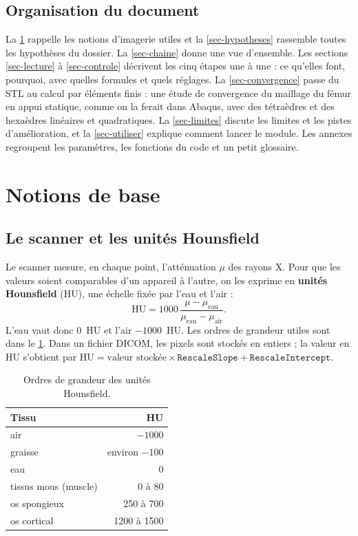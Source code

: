 \documentclass[11pt,a4paper]{article}
\begin{document}
\subsection{Organisation du document}

La \cref{sec-notions} rappelle les notions d'imagerie utiles et la \cref{sec-hypotheses} rassemble toutes les
hypothèses du dossier. La \cref{sec-chaine} donne une vue d'ensemble. Les
sections \ref{sec-lecture} à \ref{sec-controle} décrivent les cinq étapes une à une : ce qu'elles font, pourquoi, avec
quelles formules et quels réglages. La \cref{sec-convergence} passe du STL au calcul par éléments finis : une étude
de convergence du maillage du fémur en appui statique, comme on la ferait dans Abaqus, avec des tétraèdres et des
hexaèdres linéaires et quadratiques. La \cref{sec-limites} discute les limites et les pistes d'amélioration, et la
\cref{sec-utiliser} explique comment lancer le module. Les annexes regroupent les paramètres, les fonctions du code et
un petit glossaire.

\section{Notions de base}
\label{sec-notions}

\subsection{Le scanner et les unités Hounsfield}

Le scanner mesure, en chaque point, l'atténuation $\mu$ des rayons X. Pour que les valeurs soient comparables d'un
appareil à l'autre, on les exprime en \textbf{unités Hounsfield} (HU), une échelle fixée par l'eau et l'air :
\begin{equation}
  \mathrm{HU} = 1000\,\frac{\mu - \mu_{\text{eau}}}{\mu_{\text{eau}} - \mu_{\text{air}}}.
\end{equation}
L'eau vaut donc 0~HU et l'air $-1000$~HU. Les ordres de grandeur utiles sont dans le \cref{tab-hu}. Dans un fichier
DICOM, les pixels sont stockés en entiers ; la valeur en HU s'obtient par
$\mathrm{HU} = \text{valeur stockée} \times \texttt{RescaleSlope} + \texttt{RescaleIntercept}$.

\begin{table}[h]
\centering\small
\caption{Ordres de grandeur des unités Hounsfield.}
\label{tab-hu}
\begin{tabular}{lr}
\toprule
\textbf{Tissu} & \textbf{HU} \\
\midrule
air & $-1000$ \\
graisse & environ $-100$ \\
eau & 0 \\
tissus mous (muscle) & 0 à 80 \\
os spongieux & 250 à 700 \\
os cortical & 1200 à 1500 \\
\bottomrule
\end{tabular}
\end{table}
\end{document}
